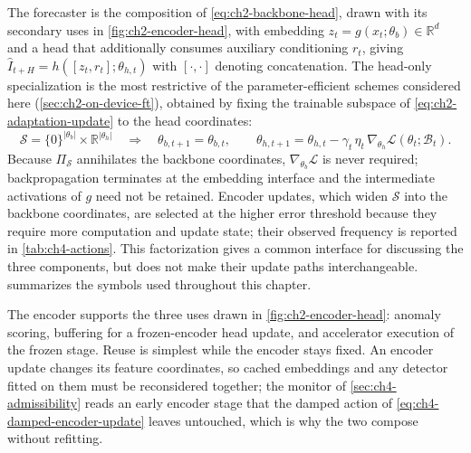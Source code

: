 The forecaster is the composition of \cref{eq:ch2-backbone-head}, drawn with its secondary uses in \cref{fig:ch2-encoder-head}, with embedding $z_t = g(x_t;\theta_b)\in\mathbb{R}^{d}$ and a head that additionally consumes auxiliary conditioning $r_t$, giving $\hat I_{t+H} = h([z_t, r_t];\theta_{h,t})$ with $[\cdot,\cdot]$ denoting concatenation. The head-only specialization is the most restrictive of the parameter-efficient schemes considered here (\cref{sec:ch2-on-device-ft}), obtained by fixing the trainable subspace of \cref{eq:ch2-adaptation-update} to the head coordinates:
\begin{equation}
\label{eq:ch4-head-only-update}
\mathcal{S} = \{0\}^{|\theta_b|} \times \mathbb{R}^{|\theta_h|}
\quad\Longrightarrow\quad
\theta_{b,t+1} = \theta_{b,t}, \qquad
\theta_{h,t+1} = \theta_{h,t} - \gamma_t\,\eta_t\, \nabla_{\theta_h}\mathcal{L}\!\left(\theta_t;\mathcal{B}_t\right).
\end{equation}
Because $\Pi_{\mathcal{S}}$ annihilates the backbone coordinates, $\nabla_{\theta_b}\mathcal{L}$ is never required; backpropagation terminates at the embedding interface and the intermediate activations of $g$ need not be retained. Encoder updates, which widen $\mathcal{S}$ into the backbone coordinates, are selected at the higher error threshold because they require more computation and update state; their observed frequency is reported in \cref{tab:ch4-actions}. This factorization gives a common interface for discussing the three components, but does not make their update paths interchangeable.  summarizes the symbols used throughout this chapter.

The encoder supports the three uses drawn in \cref{fig:ch2-encoder-head}: anomaly scoring, buffering for a frozen-encoder head update, and accelerator execution of the frozen stage. Reuse is simplest while the encoder stays fixed. An encoder update changes its feature coordinates, so cached embeddings and any detector fitted on them must be reconsidered together; the monitor of \cref{sec:ch4-admissibility} reads an early encoder stage that the damped action of \cref{eq:ch4-damped-encoder-update} leaves untouched, which is why the two compose without refitting.

